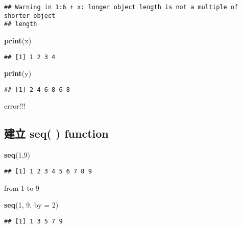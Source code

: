 \documentclass[]{article}
\newenvironment{Shaded}{\begin{snugshade}}{\end{snugshade}}
\newcommand{\DataTypeTok}[1]{\textcolor[rgb]{0.13,0.29,0.53}{#1}}
\newcommand{\DecValTok}[1]{\textcolor[rgb]{0.00,0.00,0.81}{#1}}
\newcommand{\KeywordTok}[1]{\textcolor[rgb]{0.13,0.29,0.53}{\textbf{#1}}}
\newcommand{\NormalTok}[1]{#1}
\begin{document}
\begin{verbatim}
## Warning in 1:6 + x: longer object length is not a multiple of shorter object
## length
\end{verbatim}

\begin{Shaded}
\begin{Highlighting}[]
\KeywordTok{print}\NormalTok{(x)}
\end{Highlighting}
\end{Shaded}

\begin{verbatim}
## [1] 1 2 3 4
\end{verbatim}

\begin{Shaded}
\begin{Highlighting}[]
\KeywordTok{print}\NormalTok{(y)}
\end{Highlighting}
\end{Shaded}

\begin{verbatim}
## [1] 2 4 6 8 6 8
\end{verbatim}

error!!!

\hypertarget{ux5efaux7acb-seq-function}{%
\subsection{建立 seq( ) function}\label{ux5efaux7acb-seq-function}}

\begin{Shaded}
\begin{Highlighting}[]
\KeywordTok{seq}\NormalTok{(}\DecValTok{1}\NormalTok{,}\DecValTok{9}\NormalTok{)}
\end{Highlighting}
\end{Shaded}

\begin{verbatim}
## [1] 1 2 3 4 5 6 7 8 9
\end{verbatim}

from 1 to 9

\begin{Shaded}
\begin{Highlighting}[]
\KeywordTok{seq}\NormalTok{(}\DecValTok{1}\NormalTok{, }\DecValTok{9}\NormalTok{, }\DataTypeTok{by =} \DecValTok{2}\NormalTok{)}
\end{Highlighting}
\end{Shaded}

\begin{verbatim}
## [1] 1 3 5 7 9
\end{verbatim}
\end{document}
